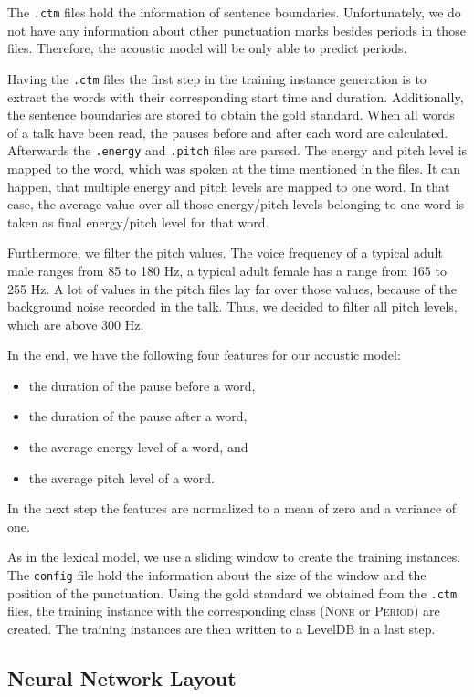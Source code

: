 The \texttt{.ctm} files hold the information of sentence boundaries.
Unfortunately, we do not have any information about other punctuation marks besides periods in those files.
Therefore, the acoustic model will be only able to predict periods.

Having the \texttt{.ctm} files the first step in the training instance generation is to extract the words with their corresponding start time and duration.
Additionally, the sentence boundaries are stored to obtain the gold standard.
When all words of a talk have been read, the pauses before and after each word are calculated.
Afterwards the \texttt{.energy} and \texttt{.pitch} files are parsed.
The energy and pitch level is mapped to the word, which was spoken at the time mentioned in the files.
It can happen, that multiple energy and pitch levels are mapped to one word.
In that case, the average value over all those energy/pitch levels belonging to one word is taken as final energy/pitch level for that word.

Furthermore, we filter the pitch values.
The voice frequency of a typical adult male ranges from 85 to 180 Hz, a typical adult female has a range from 165 to 255 Hz.
A lot of values in the pitch files lay far over those values, because of the background noise recorded in the talk.
Thus, we decided to filter all pitch levels, which are above 300 Hz.

In the end, we have the following four features for our acoustic model:
\begin{itemize}
	\item the duration of the pause before a word,
	\item the duration of the pause after a word,
	\item the average energy level of a word, and
	\item the average pitch level of a word.
\end{itemize}
In the next step the features are normalized to a mean of zero and a variance of one.

As in the lexical model, we use a sliding window to create the training instances.
The \texttt{config} file hold the information about the size of the window and the position of the punctuation.
Using the gold standard we obtained from the \texttt{.ctm} files, the training instance with the corresponding class (\textsc{None} or \textsc{Period}) are created.
The training instances are then written to a LevelDB in a last step.

\subsection{Neural Network Layout}

